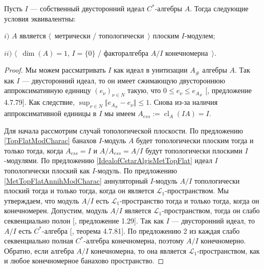 \begin{proposition}\label{CStarAlgIsTopFlatOverItsIdeal} Пусть $I$ --- собственный двусторонний идеал $C^*$-алгебры $A$. Тогда следующие условия эквивалентны: 

$i)$ $A$ является $\langle$~метрически / топологически~$\rangle$ плоским $I$-модулем;

$ii)$ $\langle$~$\operatorname{dim}(A)=1$, $I=\{0\}$ / факторалгебра $A/I$ конечномерна~$\rangle$.

\end{proposition}
\begin{proof} Мы можем рассматривать $I$ как идеал в унитизации $A_\#$ алгебры $A$. Так как $I$ --- двусторонний идеал, то он имеет сжимающую двустороннюю аппроксимативную единицу $(e_\nu)_{\nu\in N}$ такую, что $0\leq e_\nu\leq e_{A_\#}$ [\cite{HelBanLocConvAlg}, предложение 4.7.79]. Как следствие, $\sup_{\nu\in N}\Vert e_{A_\#}-e_\nu\Vert\leq 1$. Снова из-за наличия аппроксимативной единицы в $I$ мы имеем $A_{ess}:=\operatorname{cl}_A(IA)=I$.

Для начала рассмотрим случай топологической плоскости. По предложению \ref{TopFlatModCharac} банахов $I$-модуль $A$ будет топологически плоским тогда и только тогда, когда $A_{ess}=I$ и $A/A_{ess}=A/I$ будут топологически плоскими $I$-модулями. По предложению \ref{IdealofCstarAlgisMetTopFlat} идеал $I$ топологически плоский как $I$-модуль. По предложению \ref{MetTopFlatAnnihModCharac} аннуляторный $I$-модуль $A/I$ топологически плоский тогда и только тогда, когда он является $\mathscr{L}_1$-пространством. Мы утверждаем, что модуль $A/I$ есть $\mathscr{L}_1$-пространство тогда и только тогда, когда он конечномерен. Допустим, модуль $A/I$ является $\mathscr{L}_1$-пространством, тогда он слабо секвенциально полон [\cite{BourgNewClOfLpSp}, предложение 1.29]. Так как $I$ --- двусторонний идеал, то $A/I$ есть $C^*$-алгебра [\cite{HelBanLocConvAlg}, теорема 4.7.81]. По предложению 2 из \cite{SakWeakCompOpOnOpAlg} каждая слабо секвенциально полная $C^*$-алгебра конечномерна, поэтому $A/I$ конечномерно. Обратно, если алгебра $A/I$ конечномерна, то она является $\mathscr{L}_1$-пространством, как и любое конечномерное банахово пространство.


\end{proof}
